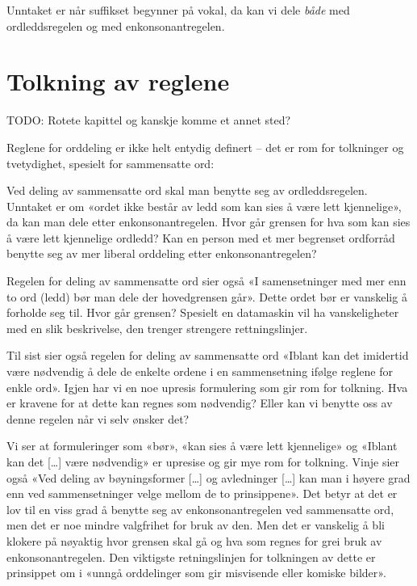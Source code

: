 Unntaket er når suffikset begynner på vokal, da kan vi dele \textit{både} med ordleddsregelen og med enkonsonantregelen.

\newline 
{}

\section{Tolkning av reglene}

TODO: Rotete kapittel og kanskje komme et annet sted?

Reglene for orddeling er ikke helt entydig definert -- det er rom for tolkninger og tvetydighet, spesielt for sammensatte ord:

\begin{items}
	\item Ved deling av sammensatte ord skal man benytte seg av ordleddsregelen. Unntaket er om «ordet ikke består av ledd som kan sies å være lett kjennelige»\cite{vinje}, da kan man dele etter enkonsonantregelen. Hvor går grensen for hva som kan sies å være lett kjennelige ordledd? Kan en person med et mer begrenset ordforråd benytte seg av mer liberal orddeling etter enkonsonantregelen?
	\item Regelen for deling av sammensatte ord sier også «I samensetninger med mer enn to ord (ledd) bør man dele der hovedgrensen går»\cite{vinje}. Dette ordet bør er vanskelig å forholde seg til. Hvor går grensen? Spesielt en datamaskin vil ha vanskeligheter med en slik beskrivelse, den trenger strengere rettningslinjer. 
	\item Til sist sier også regelen for deling av sammensatte ord «Iblant kan det imidertid være nødvendig å dele de enkelte ordene i en sammensetning ifølge reglene for enkle ord»\cite{vinje}. Igjen har vi en noe upresis formulering som gir rom for tolkning. Hva er kravene for at dette kan regnes som nødvendig? Eller kan vi benytte oss av denne regelen når vi selv ønsker det?
\end{items}

Vi ser at formuleringer som «bør», «kan sies å være lett kjennelige» og «Iblant kan det […] være nødvendig» er upresise og gir mye rom for tolkning. Vinje sier også «Ved deling av bøyningsformer […] og avledninger […] kan man i høyere grad enn ved sammensetninger velge mellom de to prinsippene»\cite{vinje}. Det betyr at det er lov til en viss grad å benytte seg av enkonsonantregelen ved sammensatte ord, men det er noe mindre valgfrihet for bruk av den. Men det er vanskelig å bli klokere på nøyaktig hvor grensen skal gå og hva som regnes for grei bruk av enkonsonantregelen. Den viktigste retningslinjen for tolkningen av dette er prinsippet om i «unngå orddelinger som gir misvisende eller komiske bilder». 

